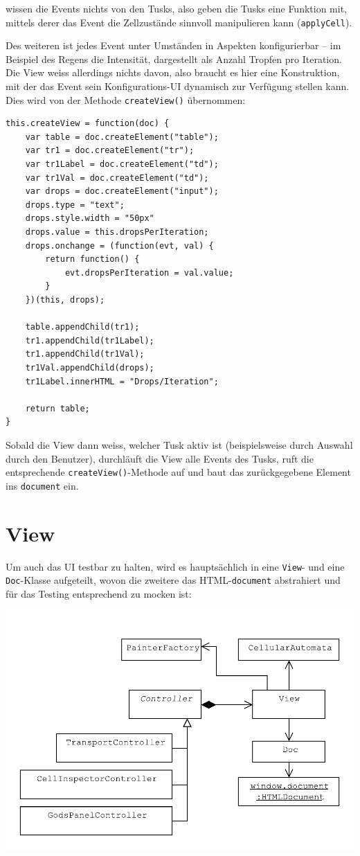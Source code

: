 \documentclass[11pt]{report} %
\theoremstyle{definition}
\begin{document}
wissen die Events nichts von den Tusks, also geben die Tusks eine Funktion mit, mittels derer das Event die Zellzustände sinnvoll manipulieren kann ({\tt applyCell}).

Des weiteren ist jedes Event unter Umständen in Aspekten konfigurierbar -- im Beispiel des Regens die Intensität, dargestellt als Anzahl Tropfen pro Iteration. Die View weiss allerdings nichts davon, also braucht es hier eine Konstruktion, mit der das Event sein Konfigurations-UI dynamisch zur Verfügung stellen kann. Dies wird von der Methode {\tt createView()} übernommen:

\begin{lstlisting}
this.createView = function(doc) {
	var table = doc.createElement("table");
	var tr1 = doc.createElement("tr");
	var tr1Label = doc.createElement("td");
	var tr1Val = doc.createElement("td");
	var drops = doc.createElement("input");
	drops.type = "text";
	drops.style.width = "50px"
	drops.value = this.dropsPerIteration;
	drops.onchange = (function(evt, val) {
		return function() {
			evt.dropsPerIteration = val.value;
		}
	})(this, drops);
	
	table.appendChild(tr1);
	tr1.appendChild(tr1Label);
	tr1.appendChild(tr1Val);
	tr1Val.appendChild(drops);
	tr1Label.innerHTML = "Drops/Iteration";
	
	return table;
}
\end{lstlisting}

Sobald die View dann weiss, welcher Tusk aktiv ist (beispielsweise durch Auswahl durch den Benutzer), durchläuft die View alle Events des Tusks, ruft die entsprechende {\tt createView()}-Methode auf und baut das zurückgegebene Element ins {\tt document} ein.

\section{View}

Um auch das UI testbar zu halten, wird es hauptsächlich in eine {\tt View}- und eine {\tt Doc}-Klasse aufgeteilt, wovon die zweitere das HTML-{\tt document} abstrahiert und für das Testing entsprechend zu mocken ist:

\includegraphics[scale=0.7]{uml/View.pdf}
\end{document}
